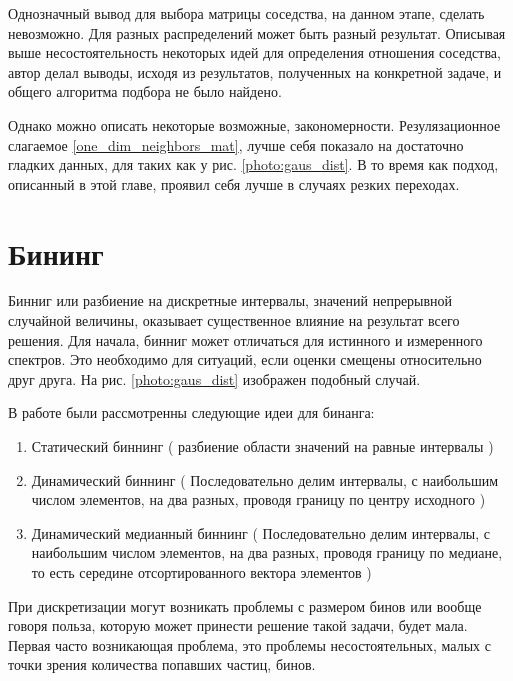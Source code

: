 \documentclass[a4paper,12pt]{diplom}
\begin{document}
Однозначный вывод для выбора матрицы соседства, на данном этапе, сделать невозможно. Для разных распределений может быть разный результат. 
Описывая выше несостоятельность некоторых идей для определения отношения соседства, автор делал выводы, исходя из результатов, полученных на 
конкретной задаче, и общего алгоритма подбора не было найдено.

Однако можно описать некоторые возможные, закономерности. Резулязационное слагаемое \eqref{one_dim_neighbors_mat}, лучше себя показало на 
достаточно гладких данных, для таких как у рис. \ref{photo:gaus_dist}. В то время как подход, описанный в этой главе, проявил себя лучше в 
случаях резких переходах.


\section{Бининг}

Бинниг или разбиение на дискретные интервалы, значений непрерывной случайной величины, оказывает существенное влияние на результат всего решения.
Для начала, бинниг может отличаться для истинного и измеренного спектров. Это необходимо для ситуаций, если оценки смещены относительно друг друга. 
На рис. \ref{photo:gaus_dist} изображен подобный случай.

В работе были рассмотренны следующие идеи для бинанга:

\begin{enumerate}
   \item Статический биннинг ( разбиение области значений на равные интервалы ) \\
   
   \item Динамический биннинг ( Последовательно делим интервалы, с наибольшим числом элементов, 
   на два разных, проводя границу по центру исходного ) \\

   \item Динамический медианный биннинг ( Последовательно делим интервалы, с наибольшим числом элементов, 
   на два разных, проводя границу по медиане, то есть середине отсортированного вектора элементов )
\end{enumerate}


При дискретизации могут возникать проблемы с размером бинов или вообще говоря польза, которую может принести решение такой задачи, будет мала. 
Первая часто возникающая проблема, это проблемы несостоятельных, малых с точки зрения количества попавших частиц, бинов. 
\end{document}
